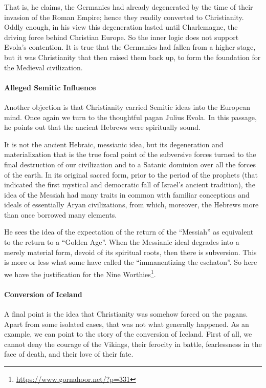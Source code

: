 That is, he claims, the Germanics had already degenerated by the time of their invasion of the Roman Empire; hence they readily converted to Christianity. Oddly enough, in his view this degeneration lasted until Charlemagne, the driving force behind Christian Europe. So the inner logic does not support Evola's contention. It is true that the Germanics had fallen from a higher stage, but it was Christianity that then raised them back up, to form the foundation for the Medieval civilization.

\paragraph{Alleged Semitic Influence}


Another objection is that Christianity carried Semitic ideas into the European mind. Once again we turn to the thoughtful pagan Julius Evola. In this passage, he points out that the ancient Hebrews were spiritually sound.

\begin{quotex}
It is not the ancient Hebraic, messianic idea, but its degeneration and materialization that is the true focal point of the subversive forces turned to the final destruction of our civilization and to a Satanic dominion over all the forces of the earth. In its original sacred form, prior to the period of the prophets (that indicated the first mystical and democratic fall of Israel's ancient tradition), the idea of the Messiah had many traits in common with familiar conceptions and ideals of essentially Aryan civilizations, from which, moreover, the Hebrews more than once borrowed many elements.
\end{quotex}


He sees the idea of the expectation of the return of the ``Messiah'' as equivalent to the return to a ``Golden Age''. When the Messianic ideal degrades into a merely material form, devoid of its spiritual roots, then there is subversion. This is more or less what some have called the ``immanentizing the eschaton''. So here we have the justification for the Nine Worthies\footnote{\url{https://www.gornahoor.net/?p=331}}.

\paragraph{Conversion of Iceland}


A final point is the idea that Christianity was somehow forced on the pagans. Apart from some isolated cases, that was not what generally happened. As an example, we can point to the story of the conversion of Iceland. First of all, we cannot deny the courage of the Vikings, their ferocity in battle, fearlessness in the face of death, and their love of their fate.

